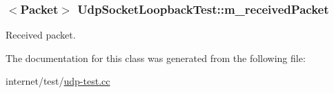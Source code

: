 \subsubsection[{\texorpdfstring{m\+\_\+received\+Packet}{m_receivedPacket}}]{$<${\bf Packet}$>$ Udp\+Socket\+Loopback\+Test\+::m\+\_\+received\+Packet}\hypertarget{classUdpSocketLoopbackTest_a14e3e2394b5c010739ba0cfe766cb951}{}\label{classUdpSocketLoopbackTest_a14e3e2394b5c010739ba0cfe766cb951}


Received packet. 



The documentation for this class was generated from the following file\+:\begin{DoxyCompactItemize}
\item 
internet/test/\hyperlink{udp-test_8cc}{udp-\/test.\+cc}\end{DoxyCompactItemize}
